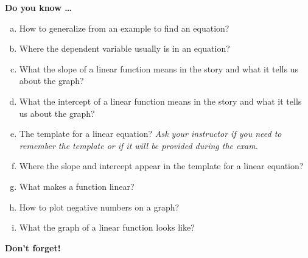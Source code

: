 \newpage



\bigskip

\noindent \textbf{Do you know \ldots} %

\begin{enumerate} [(a)]
\item How to generalize from an example to find an equation? 
\item Where the dependent variable usually is in an equation? 
\item What the slope of a linear function means in the story and what it tells us about the graph? 
\item What the intercept of a linear function means in the story and what it tells us about the graph?  
\item The template for a linear equation? \emph{Ask your instructor if you need to remember the template or if it will be provided during the exam.} 
\item Where the slope and intercept appear in the template for a linear equation?  
\item What makes a function linear? 
\item How to plot negative numbers on a graph? 
\item What the graph of a linear function looks like? 
\end{enumerate}

\bigskip

\noindent \textbf{Don't forget!}
